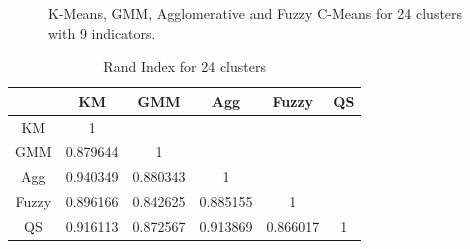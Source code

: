 \documentclass[conference]{IEEEtran}
\begin{document}
\begin{figure}

    \caption{K-Means, GMM, Agglomerative and Fuzzy C-Means for 24 clusters with 9 indicators.}
        
\end{figure}


\begin{table}[ht]
    \begin{center}
        \caption{Rand Index for 24 clusters}
        \renewcommand{\arraystretch}{1.25}
        \begin{tabular}{ |c|c|c|c|c|c| } 
            \hline
            & KM & GMM & Agg & Fuzzy & QS \\
            \hline
            KM & 1 &  &  &  &  \\
            \hline
            GMM & 0.879644 & 1 &  &  & \\ 
            \hline
            Agg & 0.940349 & 0.880343 & 1 &  & \\ 
            \hline
            Fuzzy & 0.896166 & 0.842625 & 0.885155 & 1 & \\
            \hline
            QS & 0.916113 & 0.872567 & 0.913869 & 0.866017 & 1 \\
            \hline
        \end{tabular}
    \end{center}
\end{table}
\end{document}
